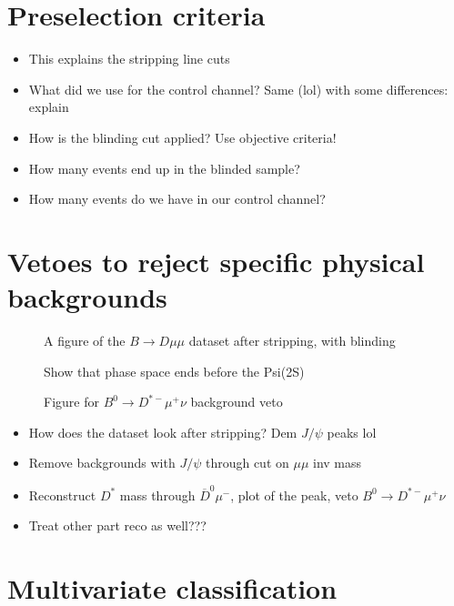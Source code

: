 \section{Preselection criteria}

\begin{itemize}
  \item This explains the stripping line cuts
  \item What did we use for the control channel? Same (lol) with some differences: explain
  \item How is the blinding cut applied? Use objective criteria!
  \item How many events end up in the blinded sample?
  \item How many events do we have in our control channel?
\end{itemize}

\section{Vetoes to reject specific physical backgrounds}

\begin{figure}
  \centering
  \missingfigure[figwidth=\textwidth]{}
  \caption{A figure of the $B\to Dμμ$ dataset after stripping, with blinding}
\end{figure}

\begin{figure}
  \centering
  \missingfigure[figwidth=\textwidth]{}
  \caption{Show that phase space ends before the Psi(2S)}
\end{figure}

\begin{figure}
  \centering
  \missingfigure[figwidth=\textwidth]{}
  \caption{Figure for $B^0\to D^{*-}μ^+ν$ background veto}
\end{figure}

\begin{itemize}
  \item How does the dataset look after stripping? Dem $J/ψ$ peaks lol
  \item Remove backgrounds with $J/ψ$ through cut on $μμ$ inv mass
  \item Reconstruct $D^*$ mass through $\overline{D}^0μ^-$, plot of the peak, veto $B^0\to D^{*-}μ^+ν$
  \item Treat other part reco as well???
\end{itemize}

\section{Multivariate classification}

